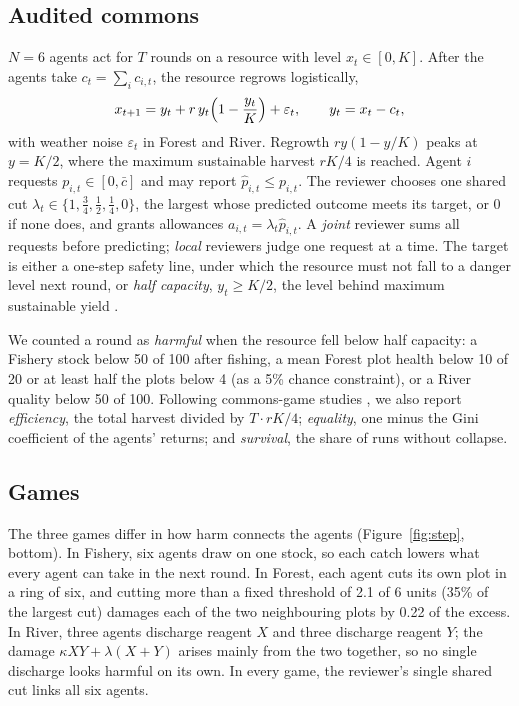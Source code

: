 \documentclass[letterpaper]{article} %
\begin{document}
\subsection{Audited commons}

$N=6$ agents act for $T$ rounds on a resource with level $x_t\in[0,K]$. After the agents take $c_t=\sum_i c_{i,t}$, the resource regrows logistically,
\begin{equation}
x_{t+1} = y_t + r\,y_t\Bigl(1-\frac{y_t}{K}\Bigr) + \varepsilon_t,\qquad y_t = x_t - c_t,
\label{eq:dyn}
\end{equation}
with weather noise $\varepsilon_t$ in Forest and River. Regrowth $r y(1-y/K)$ peaks at $y=K/2$, where the maximum sustainable harvest $rK/4$ is reached. Agent $i$ requests $p_{i,t}\in[0,\bar c]$ and may report $\hat p_{i,t}\le p_{i,t}$. The reviewer chooses one shared cut $\lambda_t\in\{1,\tfrac34,\tfrac12,\tfrac14,0\}$, the largest whose predicted outcome meets its target, or 0 if none does, and grants allowances $a_{i,t}=\lambda_t\hat p_{i,t}$. A \emph{joint} reviewer sums all requests before predicting; \emph{local} reviewers judge one request at a time. The target is either a one-step safety line, under which the resource must not fall to a danger level next round, or \emph{half capacity}, $y_t\ge K/2$, the level behind maximum sustainable yield \citep{may1978exploiting}.

We counted a round as \emph{harmful} when the resource fell below half capacity: a Fishery stock below 50 of 100 after fishing, a mean Forest plot health below 10 of 20 or at least half the plots below 4 (as a 5\% chance constraint), or a River quality below 50 of 100. Following commons-game studies \citep{piatti2024cooperate,perolat2017multiagent}, we also report \emph{efficiency}, the total harvest divided by $T\cdot rK/4$; \emph{equality}, one minus the Gini coefficient of the agents' returns; and \emph{survival}, the share of runs without collapse.

\subsection{Games}

The three games differ in how harm connects the agents (Figure~\ref{fig:step}, bottom). In Fishery, six agents draw on one stock, so each catch lowers what every agent can take in the next round. In Forest, each agent cuts its own plot in a ring of six, and cutting more than a fixed threshold of 2.1 of 6 units (35\% of the largest cut) damages each of the two neighbouring plots by 0.22 of the excess. In River, three agents discharge reagent $X$ and three discharge reagent $Y$; the damage $\kappa XY+\lambda(X+Y)$ arises mainly from the two together, so no single discharge looks harmful on its own. In every game, the reviewer's single shared cut links all six agents.
\end{document}
